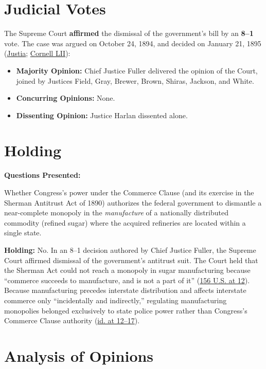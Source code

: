 \documentclass[12pt]{article}
\begin{document}
\section{Judicial Votes}
The Supreme Court \textbf{affirmed} the dismissal of the government's bill by an \textbf{8--1} vote. The case was argued on October 24, 1894, and decided on January 21, 1895 (\href{https://supreme.justia.com/cases/federal/us/156/1/}{Justia}; \href{https://www.law.cornell.edu/supremecourt/text/156/1}{Cornell LII}):

\begin{itemize}
    \item \textbf{Majority Opinion:} Chief Justice Fuller delivered the opinion of the Court, joined by Justices Field, Gray, Brewer, Brown, Shiras, Jackson, and White.
    \item \textbf{Concurring Opinions:} None.
    \item \textbf{Dissenting Opinion:} Justice Harlan dissented alone.
\end{itemize}

\section{Holding}
\textbf{Questions Presented:}

Whether Congress's power under the Commerce Clause (and its exercise in the Sherman Antitrust Act of 1890) authorizes the federal government to dismantle a near-complete monopoly in the \textit{manufacture} of a nationally distributed commodity (refined sugar) where the acquired refineries are located within a single state.

\textbf{Holding:} No. In an 8--1 decision authored by Chief Justice Fuller, the Supreme Court affirmed dismissal of the government's antitrust suit. The Court held that the Sherman Act could not reach a monopoly in sugar manufacturing because ``commerce succeeds to manufacture, and is not a part of it'' (\href{https://supreme.justia.com/cases/federal/us/156/1/}{156 U.S. at 12}). Because manufacturing precedes interstate distribution and affects interstate commerce only ``incidentally and indirectly,'' regulating manufacturing monopolies belonged exclusively to state police power rather than Congress's Commerce Clause authority (\href{https://supreme.justia.com/cases/federal/us/156/1/}{id. at 12--17}).

\section{Analysis of Opinions}
\end{document}
